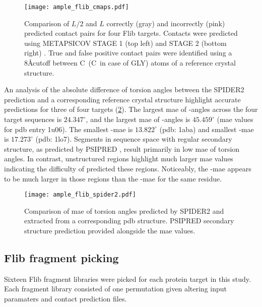 \begin{figure}[H]
	\centering
	\texttt{[image: ample\_flib\_cmaps.pdf]}
	\caption[Contact map comparison for Flib targets]{Comparison of $L/2$ and $L$ correctly (gray) and incorrectly (pink) predicted contact pairs for four Flib targets. Contacts were predicted using METAPSICOV STAGE 1 (top left) and STAGE 2 (bottom right) \cite{Jones2015-wp}. True and false positive contact pairs were identified using a 8\AA cutoff between C\textalpha\ (C\textbeta\ in case of GLY) atoms of a reference crystal structure.}
	\label{fig:ample_flib_cmaps}
\end{figure}

An analysis of the absolute difference of torsion angles between the SPIDER2 \cite{Heffernan2015-wp} prediction and a corresponding reference crystal structure highlight accurate predictions for three of four targets (\cref{fig:ample_flib_spider2}). The largest \gls{mae} of \textphi-angles across the four target sequences is $24.347^{\circ}$, and the largest \gls{mae} of \textpsi-angles is $45.459^{\circ}$ (\gls{mae} values for \gls{pdb} entry 1u06). The smallest \textphi-\gls{mae} is $13.822^{\circ}$ (\gls{pdb}: 1aba) and smallest \textpsi-\gls{mae} is $17.273^{\circ}$ (\gls{pdb}: 1lo7). Segments in sequence space with regular secondary structure, as predicted by PSIPRED \cite{Jones1999-fi}, result primarily in low \gls{mae} of torsion angles. In contrast, unstructured regions highlight much larger \gls{mae} values indicating the difficulty of predicted these regions. Noticeably, the \textpsi-\gls{mae} appears to be much larger in those regions than the \textphi-\gls{mae} for the same residue.

\begin{figure}[H]
	\centering
	\texttt{[image: ample\_flib\_spider2.pdf]}
	\caption[SPIDER2 torsion angle prediction analysis of Flib targets]{Comparison of \gls{mae} of torsion angles predicted by SPIDER2 and extracted from a corresponding \gls{pdb} structure. PSIPRED \cite{Jones1999-fi} secondary structure prediction provided alongside the \gls{mae} values.}
	\label{fig:ample_flib_spider2}
\end{figure}

\subsection{Flib fragment picking}

Sixteen Flib fragment libraries were picked for each protein target in this study. Each fragment library consisted of one permutation given altering input paramaters and contact prediction files.

